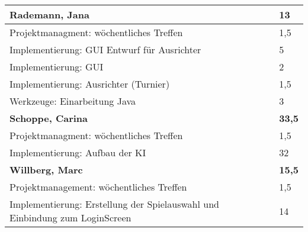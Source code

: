 \documentclass[a4paper,11pt]{scrartcl}
\begin{document}
\begin{longtable}{| p{13.8cm} | C{2.4cm} |}
	\textbf{Rademann, Jana} & \textbf{13}\\ %
	\hline

  Projektmanagment: wöchentliches Treffen
	&
  1,5
	\\
	\hline

  Implementierung: GUI Entwurf für Ausrichter
	&
  5
	\\
	\hline

  Implementierung: GUI
	&
  2
	\\
	\hline

  Implementierung: Ausrichter (Turnier)
	&
  1,5
	\\
	\hline
	
  Werkzeuge: Einarbeitung Java
	&
  3
	\\
	\hline
	\hline


	\textbf{Schoppe, Carina} & \textbf{33,5}\\ %
	\hline

  Projektmanagment: wöchentliches Treffen
	&
  1,5
	\\
	\hline

  Implementierung: Aufbau der KI
	&
  32
	\\
	\hline
	\hline


	\textbf{Willberg, Marc} & \textbf{15,5}\\ %
	\hline

  Projektmanagement: wöchentliches Treffen
	&
  1,5
	\\
	\hline

  Implementierung: Erstellung der Spielauswahl und Einbindung zum LoginScreen
	&
  14
	\\
	\hline

\end{longtable}
\end{document}
